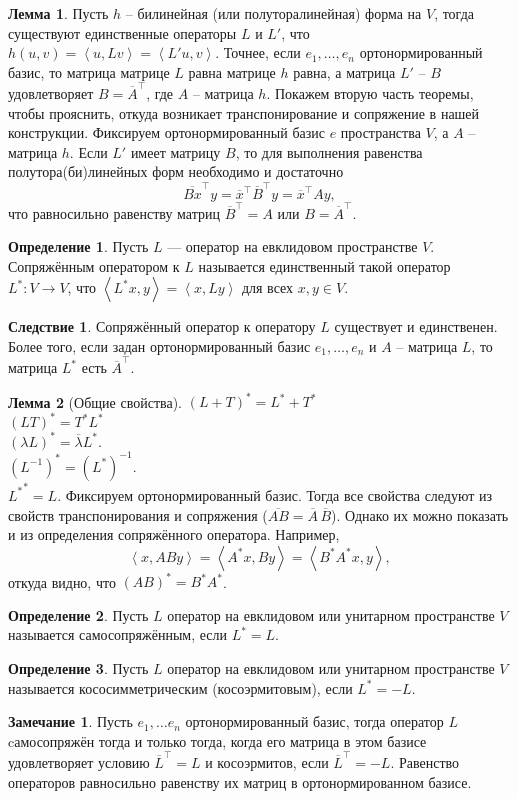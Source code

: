 \documentclass[10pt,a4paper,oneside]{book} %
\theoremstyle{definition}
\newtheorem*{rem}{Замечание}
\newtheorem*{defn}{Определение}
\newtheorem{lem}{Лемма}
\newtheorem{cor}{Следствие}
\newcommand{\ovl}{\overline}
\def\lan{\left\langle }
\def\ran{\right\rangle}
\def\dfn{\begin{defn}}
\def\edfn{\end{defn}}
\def\lm{\begin{lem}}
\def\elm{\end{lem}}
\def\crl{\begin{cor}}
\def\ecrl{\end{cor}}
\def\rm{\begin{rem}}
\def\erm{\end{rem}}
\begin{document}
\lm Пусть $h$ -- билинейная (или полуторалинейная) форма на $V$, тогда существуют единственные операторы $L$ и $L'$, что $h(u,v) = \lan u,Lv \ran= \lan L'u,v\ran $. Точнее, если $e_1,\dots,e_n$ ортонормированный базис, то матрица  матрице $L$ равна матрице $h$ равна, а матрица $L'$ -- $B$ удовлетворяет $B=\ovl{A}^{\top}$, где $A$ -- матрица $h$. 
\proof Покажем вторую часть теоремы, чтобы прояснить, откуда возникает транспонирование и сопряжение в нашей конструкции. Фиксируем ортонормированный базис $e$ пространства $V$, а $A$ -- матрица $h$. Если $L'$ имеет матрицу $B$, то для выполнения равенства полутора(би)линейных форм необходимо и достаточно  $$\ovl{Bx}^{\top}y=\ovl{x}^{\top}\ovl{B}^{\top}y=\ovl{x}^{\top}Ay,$$ 
что равносильно равенству матриц $\ovl{B}^{\top}=A$ или $B=\ovl{A}^{\top}$.
\endproof
\elm

\dfn Пусть $L$ --- оператор на евклидовом пространстве $V$. Сопряжённым оператором к $L$ называется единственный такой оператор $L^*\colon V \to V$, что $\lan L^*x,y\ran=\lan x,Ly \ran$ для всех $x,y \in V$.
\edfn

\crl Сопряжённый оператор к оператору $L$ существует и единственен. Более того, если задан ортонормированный базис $e_1,\dots,e_n$ и $A$ -- матрица $L$, то матрица $L^*$ есть $\ovl{A}^{\top}$.
\ecrl









\lm[Общие свойства]
$(L+T)^*=L^*+T^*$\\
$(LT)^*=T^*L^*$\\
$(\lambda L)^*=\ovl{\lambda}L^*$.\\
$(L^{-1})^*=(L^*)^{-1}$.\\
${L^*}^*=L$.
\proof Фиксируем ортонормированный базис. Тогда все свойства следуют из свойств транспонирования и сопряжения ($\ovl{AB} = \ovl{ A} \,\ovl{B}$).
Однако их можно показать и из определения сопряжённого оператора. Например,
$$\lan x, ABy\ran = \lan A^*x, By\ran = \lan B^*A^*x,y\ran,$$
откуда видно, что $(AB)^*=B^* A^*$. 
\endproof
\elm




\dfn Пусть $L$ оператор на евклидовом или унитарном пространстве $V$ называется самосопряжённым, если $L^*=L$.
\edfn

\dfn Пусть $L$ оператор на евклидовом или унитарном пространстве $V$ называется кососимметрическим (косоэрмитовым), если $L^*=-L$.
\edfn

\rm Пусть $e_1,\dots e_n$ ортонормированный базис, тогда оператор $L$ cамосопряжён тогда и только тогда, когда его матрица в этом базисе удовлетворяет условию $\ovl{L}^{\top}=L$ и косоэрмитов, если $\ovl{L}^{\top}=-L$.
\proof Равенство операторов равносильно равенству их матриц в ортонормированном базисе.
\endproof
\erm
\end{document}
